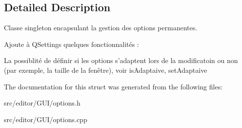 \subsection{\-Detailed \-Description}
\-Classe singleton encapsulant la gestion des options permanentes. 

\-Ajoute à \-Q\-Settings quelques fonctionnalités \-:

\-La possiblité de définir si les options s'adaptent lors de la modificatoin ou non (par exemple, la taille de la fenêtre), voir is\-Adaptaive, set\-Adaptaive 

\-The documentation for this struct was generated from the following files\-:\begin{DoxyCompactItemize}
\item 
src/editor/\-G\-U\-I/options.\-h\item 
src/editor/\-G\-U\-I/options.\-cpp\end{DoxyCompactItemize}
